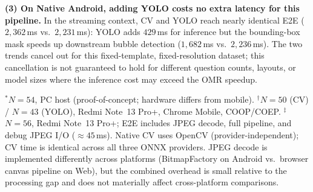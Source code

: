 \documentclass[conference]{IEEEtran}
\begin{document}
\textbf{(3) On Native Android, adding YOLO costs no extra latency for this pipeline.}
In the streaming context, CV and YOLO reach nearly identical E2E
($2{,}362$\,ms vs.\ $2{,}231$\,ms): YOLO adds $429$\,ms for inference
but the bounding-box mask speeds up downstream bubble detection
($1{,}682$\,ms vs.\ $2{,}236$\,ms). The two trends cancel out for
this fixed-template, fixed-resolution dataset; this cancellation is
not guaranteed to hold for different question counts, layouts, or
model sizes where the inference cost may exceed the OMR speedup.

\begin{table}[t]
\caption{End-to-End Latency by Platform and Configuration (ms/frame)}
\label{tab:latency}
\centering
{}
\vspace{2pt}
\parbox{\columnwidth}{\footnotesize
$^{*}$$N=54$, PC host (proof-of-concept; hardware differs from mobile).
$^{\dagger}$$N=50$ (CV) / $N=43$ (YOLO), Redmi Note~13 Pro+, Chrome Mobile, COOP/COEP.
$^{\ddagger}$$N=56$, Redmi Note~13 Pro+; E2E includes JPEG decode, full pipeline, and debug JPEG I/O ($\approx45$\,ms). Native CV uses OpenCV (provider-independent); CV time is identical across all three ONNX providers. JPEG decode is implemented differently across platforms (BitmapFactory on Android vs.\ browser canvas pipeline on Web), but the combined overhead is small relative to the processing gap and does not materially affect cross-platform comparisons.}
\end{table}
\end{document}

